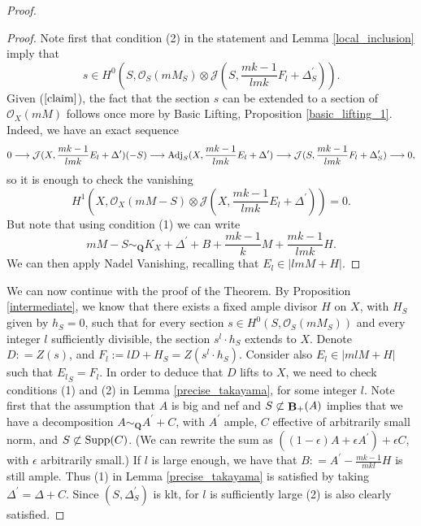 \documentclass[11pt]{amsart}
\theoremstyle{plain}
\theoremstyle{definition}
\newcommand{\lra}{\longrightarrow}
\newcommand{\QQ}{\mathbf{Q}}
\newcommand{\OO}{\mathcal  {O}}
\newcommand{\JJ}{\mathcal  {J}}
\newcommand{\Adj}{{\rm Adj}}
\DeclareMathOperator{\BB}{{\bf B}}
\begin{document}
\begin{proof}
\begin{proof}
\noindent
Note first that condition (2) in the statement and Lemma \ref{local_inclusion} imply that
\begin{equation}\label{claim}
s \in H^0 (S, \OO_S(mM_S) \otimes \JJ ( S,  \frac{mk-1}{lmk}  F_l  + \Delta^{\prime}_S) ).
\end{equation}
Given ($\ref{claim}$), the fact that the section $s$ can be extended to a section of $\OO_X(mM)$ follows once more by Basic Lifting, Proposition \ref{basic_lifting_1}. Indeed, we have an exact sequence
$$0 \lra \JJ(X, \frac{mk-1}{lmk} E_l + \Delta^{\prime})(-S) \lra \Adj_S (X, \frac{mk-1}{lmk} E_l + \Delta^{\prime})
\lra \JJ(S, \frac{mk-1}{lmk} F_l + \Delta^{\prime}_S) \lra 0,$$
so it is enough to check the vanishing
$$H^1(X, \OO_X(mM-S)\otimes  \JJ (X, \frac{mk-1}{lmk} E_l + \Delta^{\prime}))  = 0.$$
But note that using condition (1) we can write
$$mM - S \sim_{\QQ} K_X  + \Delta^{\prime} + B + \frac{mk-1}{k} M +\frac{mk-1}{lmk}H .$$
We can then apply Nadel Vanishing, recalling that $E_l \in |lmM + H|$.
\end{proof}

We can now continue with the proof of the Theorem. By Proposition \ref{intermediate}, we know that there exists a fixed ample divisor $H$ on $X$, with $H_S$ given by $h_S = 0$, such that for every section $s \in H^0 (S, \OO_S(mM_S))$ and every integer $l$ sufficiently divisible, the section $s^l \cdot h_S$ extends to $X$. Denote $D : = Z(s)$, and $F_l:= lD + H_S = Z(s^l\cdot h_S)$. 
Consider also $E_l \in |mlM + H|$ such that ${E_l}_S = F_l$. In order to deduce that $D$ lifts to $X$, we need to check conditions (1) and (2) in Lemma \ref{precise_takayama}, for some integer $l$. Note first that  
the assumption that $A$ is big and nef and $S \not\subset \BB_{+} (A)$ implies that we have a decomposition $A \sim_{\QQ} A^{\prime} + C$, with $A^{\prime}$ ample, $C$ effective of arbitrarily small norm, and $S\not\subset {\rm Supp}(C)$. (We can rewrite the sum as 
$((1-\epsilon)A + \epsilon A^{\prime}) + \epsilon C$, with $\epsilon$ arbitrarily small.) 
If $l$ is large enough, we have that $B : = A^{\prime} -  \frac{mk-1}{mkl}H$ is still 
ample. Thus (1) in Lemma \ref{precise_takayama} is satisfied by taking $\Delta^\prime = \Delta  + C$. Since $(S, \Delta^{\prime}_S)$
is klt, for $l$ is sufficiently large (2) is also clearly satisfied.


\end{proof}
\end{document}
